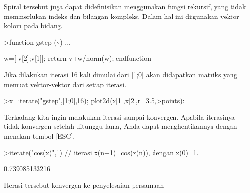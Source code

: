 \documentclass{article}
\begin{document}
\begin{eulernotebook}
\begin{eulercomment}
\begin{eulercomment}
\begin{eulercomment}
\begin{eulercomment}
\begin{eulercomment}
\begin{eulercomment}
\begin{eulercomment}
\begin{eulercomment}
\begin{eulercomment}
\begin{eulercomment}
\begin{eulercomment}
\begin{eulercomment}
\begin{eulercomment}
\begin{eulercomment}
\begin{eulercomment}
\begin{eulercomment}
\begin{eulercomment}
\begin{eulercomment}
\begin{eulercomment}
\begin{eulercomment}
\begin{eulercomment}
\begin{eulercomment}
\begin{eulercomment}
\begin{eulercomment}
\begin{eulercomment}
\begin{eulercomment}
\begin{eulercomment}
\begin{eulercomment}
\begin{eulercomment}
\begin{eulercomment}
\begin{eulercomment}
Spiral tersebut juga dapat didefinisikan menggunakan fungsi rekursif,
yang tidak memmerlukan indeks dan bilangan kompleks. Dalam hal ini
diigunakan vektor kolom pada bidang.
\end{eulercomment}
\begin{eulerprompt}
>function gstep (v) ...
\end{eulerprompt}
\begin{eulerudf}
  w=[-v[2];v[1]];
  return v+w/norm(w);
  endfunction
\end{eulerudf}
\begin{eulercomment}
Jika dilakukan iterasi 16 kali dimulai dari [1;0] akan didapatkan
matriks yang memuat vektor-vektor dari setiap iterasi.
\end{eulercomment}
\begin{eulerprompt}
>x=iterate("gstep",[1;0],16); plot2d(x[1],x[2],r=3.5,>points):
\end{eulerprompt}
\begin{eulercomment}
\begin{eulercomment}
\begin{eulercomment}
Terkadang kita ingin melakukan iterasi sampai konvergen. Apabila
iterasinya tidak konvergen setelah ditunggu lama, Anda dapat
menghentikannya dengan menekan tombol [ESC].
\end{eulercomment}
\begin{eulerprompt}
>iterate("cos(x)",1) // iterasi x(n+1)=cos(x(n)), dengan x(0)=1.
\end{eulerprompt}
\begin{euleroutput}
  0.739085133216
\end{euleroutput}
\begin{eulercomment}
Iterasi tersebut konvergen ke penyelesaian persamaan


\end{eulercomment}
\end{eulercomment}
\end{eulercomment}
\end{eulercomment}
\end{eulercomment}
\end{eulercomment}
\end{eulercomment}
\end{eulercomment}
\end{eulercomment}
\end{eulercomment}
\end{eulercomment}
\end{eulercomment}
\end{eulercomment}
\end{eulercomment}
\end{eulercomment}
\end{eulercomment}
\end{eulercomment}
\end{eulercomment}
\end{eulercomment}
\end{eulercomment}
\end{eulercomment}
\end{eulercomment}
\end{eulercomment}
\end{eulercomment}
\end{eulercomment}
\end{eulercomment}
\end{eulercomment}
\end{eulercomment}
\end{eulercomment}
\end{eulercomment}
\end{eulercomment}
\end{eulercomment}
\end{eulercomment}
\end{eulernotebook}
\end{document}
